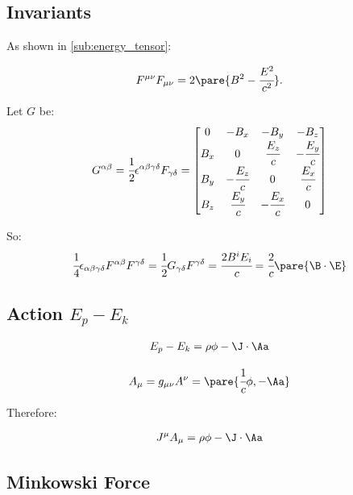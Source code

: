 \subsection{Invariants}
  As shown in \autoref{sub:energy_tensor}:

  \begin{align}
    F^{\mu\nu}F_{\mu\nu} = 2\pare{B^2 - \cfrac{E^2}{c^2}}.
  \end{align}

  Let $G$ be:
  \begin{align}
    G^{\alpha\beta} = \cfrac{1}{2}\epsilon^{\alpha\beta\gamma\delta}F_{\gamma\delta} =
    \begin{bmatrix}
      0 & -B_x & -B_y & -B_z \\
      B_x & 0 & \cfrac{E_z}{c} & -\cfrac{E_y}{c} \\
      B_y & -\cfrac{E_z}{c} & 0 & \cfrac{E_x}{c} \\
      B_z & \cfrac{E_y}{c} & -\cfrac{E_x}{c} & 0
    \end{bmatrix}
  \end{align}

  So:
  \begin{align}
    \cfrac{1}{4}\epsilon_{\alpha\beta\gamma\delta}F^{\alpha\beta}F^{\gamma\delta} = \cfrac{1}{2}G_{\gamma\delta}F^{\gamma\delta} = \cfrac{2B^iE_i}{c} = \cfrac{2}{c}\pare{\B \cdot \E}
  \end{align}

\subsection{Action $E_p - E_k$}

  \begin{align}
    E_p - E_k = \rho\phi - \J \cdot \Aa
  \end{align}

  \begin{align}
    A_\mu = g_{\mu\nu}A^{\nu} = \pare{\cfrac{1}{c}\phi,- \Aa}
  \end{align}

  Therefore:

  \begin{align}
    J^\mu A_{\mu} = \rho\phi - \J\cdot\Aa
  \end{align}

\subsection{Minkowski Force}

